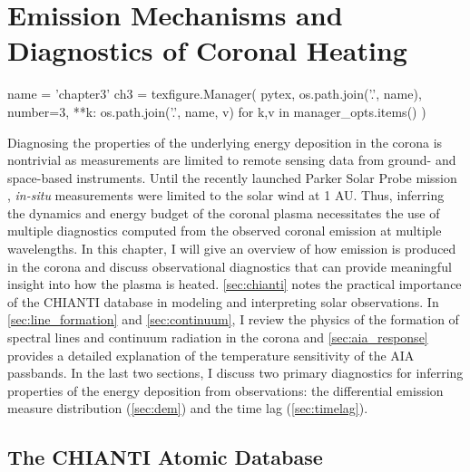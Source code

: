 \chapter{Emission Mechanisms and Diagnostics of Coronal Heating}\label{ch:diagnostics}
\thispagestyle{firstpageofchapterstyle}

\begin{pycode}[chapter3]
name = 'chapter3'
ch3 = texfigure.Manager(
    pytex,
    os.path.join('.', name),
    number=3,
    **{k: os.path.join('.', name, v) for k,v in manager_opts.items()}
)
\end{pycode}

Diagnosing the properties of the underlying energy deposition in the corona is nontrivial as measurements are limited to remote sensing data from ground- and space-based instruments. Until the recently launched Parker Solar Probe mission \citep{fox_solar_2016-1}, \textit{in-situ} measurements were limited to the solar wind at 1 AU. Thus, inferring the dynamics and energy budget of the coronal plasma necessitates the use of multiple diagnostics computed from the observed coronal emission at multiple wavelengths. In this chapter, I will give an overview of how emission is produced in the corona and discuss observational diagnostics that can provide meaningful insight into how the plasma is heated. \autoref{sec:chianti} notes the practical importance of the CHIANTI database in modeling and interpreting solar observations. In \autoref{sec:line_formation} and \autoref{sec:continuum}, I review the physics of the formation of spectral lines and continuum radiation in the corona and \autoref{sec:aia_response} provides a detailed explanation of the temperature sensitivity of the AIA passbands. In the last two sections, I discuss two primary diagnostics for inferring properties of the energy deposition from observations: the differential emission measure distribution (\autoref{sec:dem}) and the time lag (\autoref{sec:timelag}).

\section{The CHIANTI Atomic Database}\label{sec:chianti}

